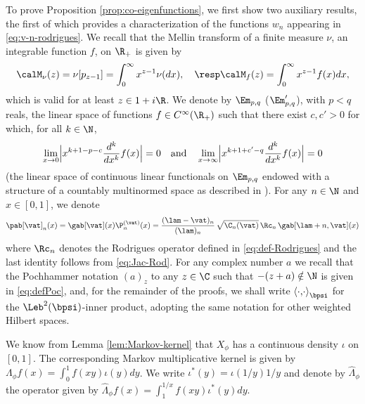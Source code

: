 To prove Proposition \ref{prop:co-eigenfunctions}, we first show two auxiliary results, the first of which provides
a characterization of the functions $w_n$ appearing in \eqref{eq:v-n-rodrigues}.
We recall that the Mellin transform of a finite measure $\nu$, \resp an integrable function $f$, on $\R_+$ is given by
\begin{equation*}
\calM_{\nu}(z) = \nu[p_{z-1}] = \int_0^\infty x^{z-1}\nu(dx), \quad \resp \calM_{f}(z)=\int_0^\infty x^{z-1}f(x)dx,
\end{equation*}
which is valid for at least $z \in 1+i\R$. We denote by $\Em_{p,q}$ (\resp $\Em_{p,q}'$), with $p < q$ reals, the linear space of functions $f \in C^\infty(\R_+)$ such that there exist $c, c' > 0$ for which, for all $k \in \N$,
\begin{equation*}
\lim_{x\to 0} \Bigl| x^{k+1-p-c} \frac{d^k}{dx^k}f(x)\Bigr| = 0 \quad \text{and} \quad \lim_{x\to \infty} \Bigl| x^{k+1+c'-q} \frac{d^k}{dx^k}f(x)\Bigr| = 0
\end{equation*}
(\resp the linear space of continuous linear functionals on $\Em_{p,q}$ endowed with a structure of a countably multinormed space as described in \cite[p.\,231]{Misra-Lavoine}). For any $n \in \N$ and $x\in [0,1]$, we denote
\begin{equation*}
\pab[\vat]_n(x) = \gab[\vat](x) \P_n^{(\vat)}(x) = \frac{(\lam-\vat)_n}{(\lam)_n}\, \sqrt{\C_n(\vat)}\, \Rc_{n}\, \gab[\lam+n,\vat](x)
\end{equation*}
where $\Rc_{n}$ denotes the Rodrigues operator defined in \eqref{eq:def-Rodrigues} and the last identity follows from \eqref{eq:Jac-Rod}. For any complex number $a$ we recall that the Pochhammer notation $(a)_z$ to any $z \in \C$ such that $-(z+a) \notin \N$ is given in \eqref{eq:defPoc}, and, for the remainder of the proofs, we shall write $\left\langle \cdot{,}\cdot \right\rangle_{\bpsi}$ for the $\Leb^2(\bpsi)$-inner product, adopting the same notation for other weighted Hilbert spaces.

We know from Lemma \ref{lem:Markov-kernel} that $X_{\phi}$ has a continuous density $\iota$ on $[0,1]$.
The corresponding Markov multiplicative kernel is given by $\Lambda_{\phi} f(x) = \int_0^1 f(xy) \iota(y)dy$.
We write $\iota^*(y)=\iota(1/y)1/y$ and denote by $\hat{\Lambda}_{\phi}$ the operator given by
$\widehat{\Lambda}_{\phi} f(x) = \int_1^{1/x}f(xy)\iota^*(y)dy$.


